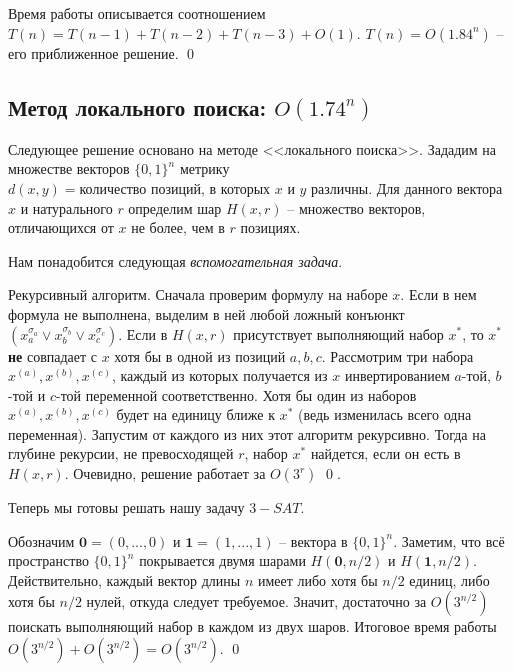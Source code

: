 Время работы описывается соотношением $T(n) = T(n-1) + T(n-2) + T(n-3) + O(1)$. $T(n) = O(1.84^n)$ -- его приближенное решение. \qed

\needpicture

\subsection{Метод локального поиска: $O(1.74^n)$}
Следующее решение основано на методе <<локального поиска>>. Зададим на множестве векторов $\{0, 1\}^n$ метрику $d(x, y) = \text{количество позиций, в которых } x \text{ и } y \text{ различны}$. Для данного вектора $x$ и натурального $r$ определим шар $H(x, r)$ -- множество векторов, отличающихся от $x$ не более, чем в $r$ позициях.

Нам понадобится следующая \hypertarget{flip20}{\textit{вспомогательная задача}}.


 Рекурсивный алгоритм. Сначала проверим формулу на наборе $x$. Если в нем формула не выполнена, выделим в ней любой ложный конъюнкт $(x_a^{\sigma_a} \lor x_b^{\sigma_b} \lor x_c^{\sigma_c})$. Если в $H(x, r)$ присутствует выполняющий набор $x^*$, то $x^*$ \textbf{не} совпадает с $x$ хотя бы в одной из позиций $a,b,c$. Рассмотрим три набора $x^{(a)}, x^{(b)}, x^{(c)}$, каждый из которых получается из $x$ инвертированием $a$-той, $b$-той и $c$-той переменной соответственно. Хотя бы один из наборов  $x^{(a)}, x^{(b)}, x^{(c)}$ будет на единицу ближе к $x^*$ (ведь изменилась всего одна переменная). Запустим от каждого из них этот алгоритм рекурсивно. Тогда на глубине рекурсии, не превосходящей $r$, набор $x^*$ найдется, если он есть в $H(x, r)$. Очевидно, решение работает за $O(3^r)$ \qed.

Теперь мы готовы решать нашу задачу $3-SAT$.


Обозначим $\mathbf 0 = (0, ..., 0)$ и $\mathbf 1 = (1, ..., 1)$ -- вектора в $\{0, 1\}^n$. Заметим, что всё пространство $\{0, 1\}^n$ покрывается двумя шарами $H(\mathbf 0, n/2)$ и $H(\mathbf 1, n/2)$. Действительно, каждый вектор длины $n$ имеет либо хотя бы $n/2$ единиц, либо хотя бы $n/2$ нулей, откуда следует требуемое. Значит, достаточно за $O(3^{n/2})$ поискать выполняющий набор в каждом из двух шаров. Итоговое время работы $O(3^{n/2}) + O(3^{n/2}) = O(3^{n/2})$. \qed




